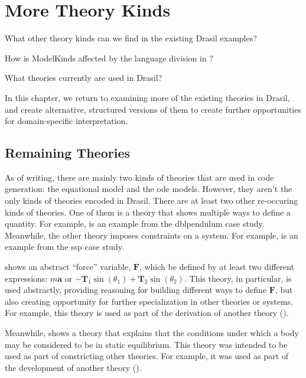 \chapter{More Theory Kinds}
\label{chap:more-theory-kinds}

\begin{writingdirectives}
	\item What other theory kinds can we find in the existing Drasil examples?
	\item How is ModelKinds affected by the language division in
	?
	\item What theories currently are used in Drasil?
\end{writingdirectives}

In this chapter, we return to examining more of the existing theories in Drasil,
and create alternative, structured versions of them to create further
opportunities for domain-specific interpretation.

\section{Remaining Theories}
\label{chap:more-theory-kinds:sec:remaining-theories}

As of writing, there are mainly two kinds of theories that are used in code
generation: the equational model and the \acs{ode} models. However, they aren't
the only kinds of theories encoded in Drasil. There are at least two other
re-occuring kinds of theories. One of them is a theory that shows multiple ways
to define a quantity. For example,  is an example
from the \acs{dblpendulum} case study. Meanwhile, the other theory imposes
constraints on a system. For example,  is
an example from the \acs{ssp} case study.

 shows an abstract ``force'' variable,
\(\mathbf{F}\), which be defined by at least two different expressions: \(m
\mathbf{a}\) or \(-{\mathbf{T}_{1}}
\sin\left({\theta_{1}}\right)+{\mathbf{T}_{2}} \sin\left({\theta_{2}}\right)\).
This theory, in particular, is used abstractly, providing reasoning for building
different ways to define \(\mathbf{F}\), but also creating opportunity for
further specialization in other theories or systems. For example, this theory is
used as part of the derivation of another theory
().

Meanwhile,  shows a theory that explains
that the conditions under which a body may be considered to be in static
equilibrium. This theory was intended to be used as part of constricting other
theories. For example, it was used as part of the development of another theory
().

